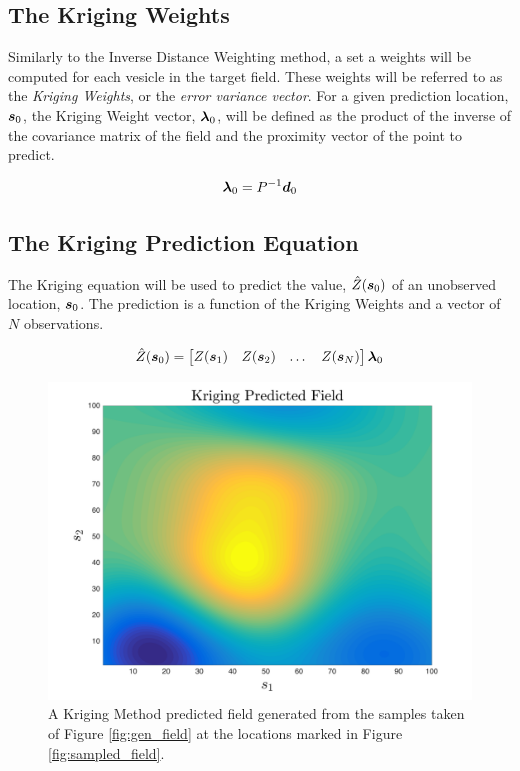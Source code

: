 \subsection{The Kriging Weights}
Similarly to the Inverse Distance Weighting method, a set a weights will be computed for each vesicle in the target field. These weights will be referred to as the \textit{Kriging Weights}, or the \textit{error variance vector}. For a given prediction location, ${\it{\boldsymbol{s}}}_0$, the Kriging Weight vector, ${\it{\boldsymbol{\lambda}}}_0$, will be defined as the product of the inverse of the covariance matrix of the field and the proximity vector of the point to predict.

\begin{equation}
    {\it{\boldsymbol{\lambda}}}_{0} = P^{-1}{\it{\boldsymbol{d}}}_{0}
    \label{eq:krigweights}
\end{equation}

\subsection{The Kriging Prediction Equation}
The Kriging equation will be used to predict the value, $\hat{Z}({\it{\boldsymbol{s}}}_0)$ of an unobserved location, ${\it{\boldsymbol{s}}}_0$. The prediction is a function of the Kriging Weights and a vector of $N$ observations. 

\begin{equation}
    \hat{Z}({\it{\boldsymbol{s}}}_0) = \begin{bmatrix} Z({\it{\boldsymbol{s}}}_1) & Z({\it{\boldsymbol{s}}}_2) & \dots & Z({\it{\boldsymbol{s}}}_N) \end{bmatrix}{\it{\boldsymbol{\lambda}}}_{0}
    \label{eq:krigeq}
\end{equation}

\begin{figure}[!]
    \centering
    \includegraphics[width=0.8\linewidth]{figures/kriging_prediction.png}
    \caption{A Kriging Method predicted field generated from the samples taken of Figure \ref{fig:gen_field} at the locations marked in Figure \ref{fig:sampled_field}.}
    \label{fig:krig_field}
\end{figure}

